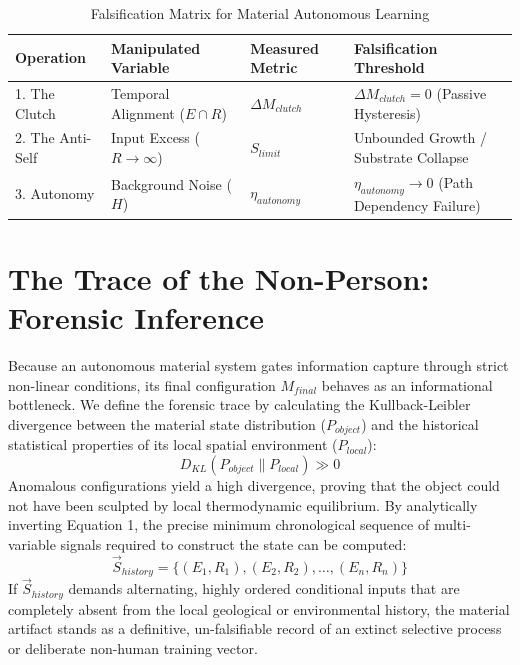 \documentclass[11pt,a4paper]{article}
\begin{document}
\begin{table}[h!]
\centering
\caption{Falsification Matrix for Material Autonomous Learning}
\begin{tabular}{llll}
\toprule
\textbf{Operation} & \textbf{Manipulated Variable} & \textbf{Measured Metric} & \textbf{Falsification Threshold} \\
\midrule
1. The Clutch & Temporal Alignment ($E \cap R$) & $\Delta M_{clutch}$ & $\Delta M_{clutch} = 0$ (Passive Hysteresis) \\
2. The Anti-Self & Input Excess ($R \to \infty$) & $S_{limit}$ & Unbounded Growth / Substrate Collapse \\
3. Autonomy & Background Noise ($H$) & $\eta_{autonomy}$ & $\eta_{autonomy} \to 0$ (Path Dependency Failure) \\
\bottomrule
\end{tabular}
\end{table}

\section{The Trace of the Non-Person: Forensic Inference}
Because an autonomous material system gates information capture through strict non-linear conditions, its final configuration $M_{final}$ behaves as an informational bottleneck. We define the forensic trace by calculating the Kullback-Leibler divergence between the material state distribution ($P_{object}$) and the historical statistical properties of its local spatial environment ($P_{local}$):
\begin{equation}
D_{KL}(P_{object} \parallel P_{local}) \gg 0
\end{equation}
Anomalous configurations yield a high divergence, proving that the object could not have been sculpted by local thermodynamic equilibrium. By analytically inverting Equation 1, the precise minimum chronological sequence of multi-variable signals required to construct the state can be computed:
\begin{equation}
\vec{S}_{history} = \{ (E_1, R_1), (E_2, R_2), \dots, (E_n, R_n) \}
\end{equation}
If $\vec{S}_{history}$ demands alternating, highly ordered conditional inputs that are completely absent from the local geological or environmental history, the material artifact stands as a definitive, un-falsifiable record of an extinct selective process or deliberate non-human training vector.
\end{document}
